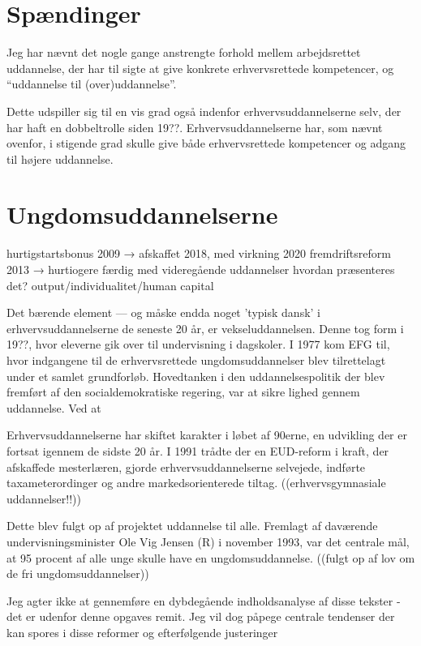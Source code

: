 \section{Spændinger}

Jeg har nævnt det nogle gange anstrengte forhold mellem arbejdsrettet uddannelse, der har til sigte at give konkrete erhvervsrettede kompetencer, og “uddannelse til (over)uddannelse”.

Dette udspiller sig til en vis grad også indenfor erhvervsuddannelserne selv, der har haft en dobbeltrolle siden 19??.
Erhvervsuddannelserne har, som nævnt ovenfor, i stigende grad skulle give både erhvervsrettede kompetencer og adgang til højere uddannelse.


\section{Ungdomsuddannelserne}

hurtigstartsbonus 2009 → afskaffet 2018, med virkning 2020
fremdriftsreform 2013 → hurtiogere færdig med videregående uddannelser
hvordan præsenteres det? output/individualitet/human capital

Det bærende element --- og måske endda noget 'typisk dansk' i erhvervsuddannelserne de seneste 20 år, er vekseluddannelsen.
Denne tog form i 19??, hvor eleverne gik over til undervisning i dagskoler.
I 1977 kom EFG til, hvor indgangene til de erhvervsrettede ungdomsuddannelser blev tilrettelagt under et samlet grundforløb.
Hovedtanken i den uddannelsespolitik der blev fremført af den socialdemokratiske regering, var at sikre lighed gennem uddannelse.
Ved at 

Erhvervsuddannelserne har skiftet karakter i løbet af 90erne, en udvikling der er fortsat igennem de sidste 20 år.
I 1991 trådte der en EUD-reform i kraft, der afskaffede mesterlæren, gjorde erhvervsuddannelserne selvejede, indførte taxameterordinger og andre markedsorienterede tiltag.
((erhvervsgymnasiale uddannelser!!))


Dette blev fulgt op af projektet uddannelse til alle.
Fremlagt af daværende undervisningsminister Ole Vig Jensen (R) i november 1993, var det centrale mål, at 95 procent af alle unge skulle have en ungdomsuddannelse.
((fulgt op af lov om de fri ungdomsuddannelser))

Jeg agter ikke at gennemføre en dybdegående indholdsanalyse af disse tekster - det er udenfor denne opgaves remit.
Jeg vil dog påpege centrale tendenser der kan spores i disse reformer og efterfølgende justeringer

